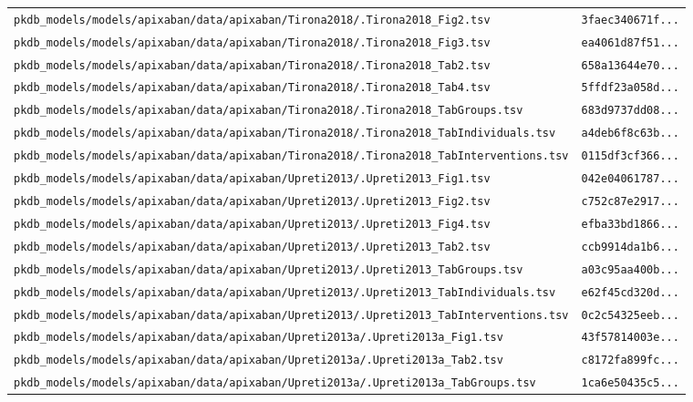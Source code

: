 \begin{longtable}{ll}
\texttt{pkdb\_models/models/apixaban/data/apixaban/Tirona2018/.Tirona2018\_Fig2.tsv} & \texttt{3faec340671f...} \\
\texttt{pkdb\_models/models/apixaban/data/apixaban/Tirona2018/.Tirona2018\_Fig3.tsv} & \texttt{ea4061d87f51...} \\
\texttt{pkdb\_models/models/apixaban/data/apixaban/Tirona2018/.Tirona2018\_Tab2.tsv} & \texttt{658a13644e70...} \\
\texttt{pkdb\_models/models/apixaban/data/apixaban/Tirona2018/.Tirona2018\_Tab4.tsv} & \texttt{5ffdf23a058d...} \\
\texttt{pkdb\_models/models/apixaban/data/apixaban/Tirona2018/.Tirona2018\_TabGroups.tsv} & \texttt{683d9737dd08...} \\
\texttt{pkdb\_models/models/apixaban/data/apixaban/Tirona2018/.Tirona2018\_TabIndividuals.tsv} & \texttt{a4deb6f8c63b...} \\
\texttt{pkdb\_models/models/apixaban/data/apixaban/Tirona2018/.Tirona2018\_TabInterventions.tsv} & \texttt{0115df3cf366...} \\
\texttt{pkdb\_models/models/apixaban/data/apixaban/Upreti2013/.Upreti2013\_Fig1.tsv} & \texttt{042e04061787...} \\
\texttt{pkdb\_models/models/apixaban/data/apixaban/Upreti2013/.Upreti2013\_Fig2.tsv} & \texttt{c752c87e2917...} \\
\texttt{pkdb\_models/models/apixaban/data/apixaban/Upreti2013/.Upreti2013\_Fig4.tsv} & \texttt{efba33bd1866...} \\
\texttt{pkdb\_models/models/apixaban/data/apixaban/Upreti2013/.Upreti2013\_Tab2.tsv} & \texttt{ccb9914da1b6...} \\
\texttt{pkdb\_models/models/apixaban/data/apixaban/Upreti2013/.Upreti2013\_TabGroups.tsv} & \texttt{a03c95aa400b...} \\
\texttt{pkdb\_models/models/apixaban/data/apixaban/Upreti2013/.Upreti2013\_TabIndividuals.tsv} & \texttt{e62f45cd320d...} \\
\texttt{pkdb\_models/models/apixaban/data/apixaban/Upreti2013/.Upreti2013\_TabInterventions.tsv} & \texttt{0c2c54325eeb...} \\
\texttt{pkdb\_models/models/apixaban/data/apixaban/Upreti2013a/.Upreti2013a\_Fig1.tsv} & \texttt{43f57814003e...} \\
\texttt{pkdb\_models/models/apixaban/data/apixaban/Upreti2013a/.Upreti2013a\_Tab2.tsv} & \texttt{c8172fa899fc...} \\
\texttt{pkdb\_models/models/apixaban/data/apixaban/Upreti2013a/.Upreti2013a\_TabGroups.tsv} & \texttt{1ca6e50435c5...} \\

\end{longtable}

